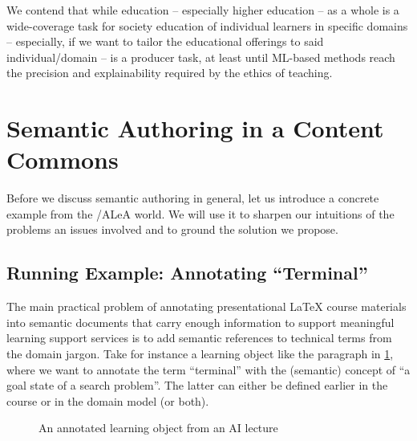 \documentclass{llncs}
\newcommand\ALeA{\textsf{ALeA}\xspace}
\begin{document}
We contend that while education -- especially higher education -- as a whole is a
wide-coverage task for society education of individual learners in specific domains --
especially, if we want to tailor the educational offerings to said individual/domain -- is
a producer task, at least until ML-based methods reach the precision and explainability
required by the ethics of teaching.

\section{Semantic Authoring in a Content Commons}

Before we discuss semantic authoring in general, let us introduce a concrete example from
the \sTeX/\ALeA world. We will use it to sharpen our intuitions of the problems an issues
involved and to ground the solution we propose.

\subsection{Running Example: Annotating  ``Terminal''}
The main practical problem of annotating presentational {\LaTeX} course materials into
semantic documents that carry enough information to support meaningful learning support
services is to add semantic references to technical terms from the domain jargon.
Take for instance a learning object like the paragraph in \cref{fig:lo}, where we want to annotate
the term ``terminal'' with the (semantic) concept of ``a goal state of a search
problem''. The latter can either be defined earlier in the course or in the domain model
(or both).



\begin{figure}[ht]\centering
  \caption{An annotated learning object from an AI lecture}\label{fig:lo}
\end{figure}
\end{document}
